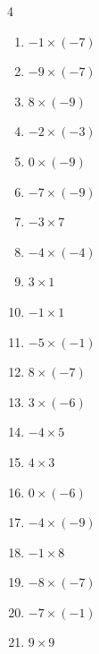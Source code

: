 \begin{multicols}{4}
\begin{enumerate}
  \item $-1\times (-7)$
        \phantom{$=7$}

  \item $-9\times (-7)$
        \phantom{$=63$}

  \item $8\times (-9)$
        \phantom{$=-72$}

  \item $-2\times (-3)$
        \phantom{$=6$}

  \item $0\times (-9)$
        \phantom{$=0$}

  \item $-7\times (-9)$
        \phantom{$=63$}

  \item $-3\times 7$
        \phantom{$=-21$}

  \item $-4\times (-4)$
        \phantom{$=16$}

  \item $3\times 1$
        \phantom{$=3$}

  \item $-1\times 1$
        \phantom{$=-1$}

  \item $-5\times (-1)$
        \phantom{$=5$}

  \item $8\times (-7)$
        \phantom{$=-56$}

  \item $3\times (-6)$
        \phantom{$=-18$}

  \item $-4\times 5$
        \phantom{$=-20$}

  \item $4\times 3$
        \phantom{$=12$}

  \item $0\times (-6)$
        \phantom{$=0$}

  \item $-4\times (-9)$
        \phantom{$=36$}

  \item $-1\times 8$
        \phantom{$=-8$}

  \item $-8\times (-7)$
        \phantom{$=56$}

  \item $-7\times (-1)$
        \phantom{$=7$}

  \item $9\times 9$
        \phantom{$=81$}


\end{enumerate}
\end{multicols}
